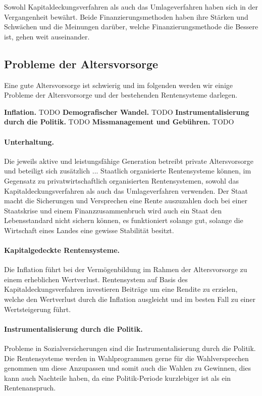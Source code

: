 Sowohl Kapitaldeckungsverfahren als auch das Umlageverfahren haben sich in der Vergangenheit bewährt. Beide Finanzierungsmethoden haben ihre Stärken und Schwächen und die Meinungen darüber, welche Finanzierungsmethode die Bessere ist, gehen weit auseinander.


\subsection{Probleme der Altersvorsorge}

Eine gute Altersvorsorge ist schwierig und im folgenden werden wir einige Probleme der Altersvorsorge und der bestehenden Rentensysteme darlegen.

\textbf{Inflation.}  TODO
\textbf{Demografischer Wandel.} TODO
\textbf{Instrumentalisierung durch die Politik.} TODO
\textbf{Missmanagement und Gebühren.} TODO

\paragraph{Unterhaltung.} Die jeweils aktive und leistungsfähige Generation betreibt private Altersvorsorge und beteiligt sich zusätzlich ...
Staatlich organisierte Rentensysteme können, im Gegensatz zu privatwirtschaftlich organisierten Rentensystemen, sowohl das Kapitaldeckungsverfahren als auch das Umlageverfahren verwenden. 
Der Staat macht die Sicherungen und Versprechen eine Rente auszuzahlen doch bei einer Staatskrise und einem Finanzzusammenbruch wird auch ein Staat den Lebensstandard nicht sichern können, es funktioniert solange gut, solange die Wirtschaft eines Landes eine gewisse Stabilität besitzt.

\paragraph{Kapitalgedeckte Rentensysteme.} Die Inflation führt bei der Vermögenbildung im Rahmen der Altersvorsorge zu einem erheblichen Wertverlust. 
Rentensystem auf Basis des Kapitaldeckungsverfahren investieren Beiträge um eine Rendite zu erzielen, welche den Wertverlust durch die Inflation ausgleicht und im besten Fall zu einer Wertsteigerung führt.

\paragraph{Instrumentalisierung durch die Politik.} Probleme in Sozialversicherungen sind die Instrumentalisierung durch die Politik.
Die Rentensysteme werden in Wahlprogrammen gerne für die Wahlversprechen genommen um diese Anzupassen und somit auch die Wahlen zu Gewinnen, dies kann auch Nachteile haben, da eine Politik-Periode kurzlebiger ist als ein Rentenanspruch. 

